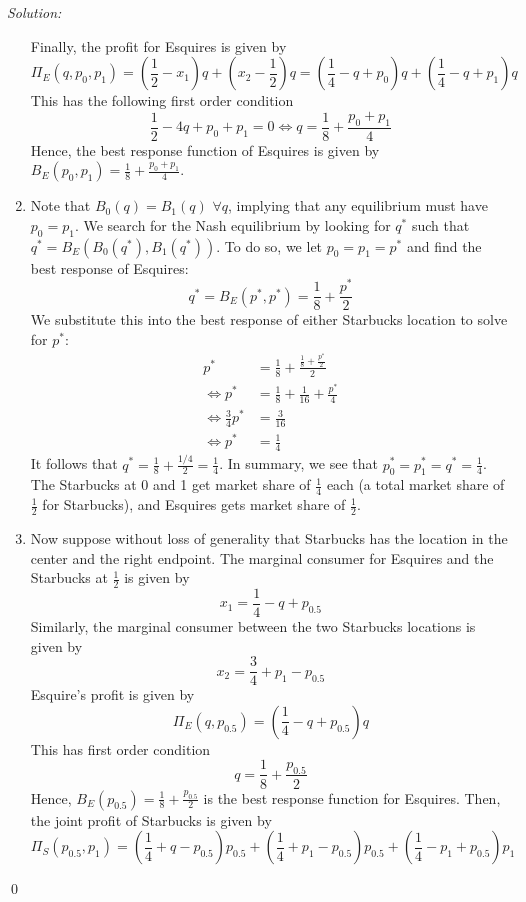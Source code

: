 \documentclass[12pt]{article}
\newenvironment{sol}
    {\emph{Solution:}
    }
    {
    \qed
    }
\begin{document}
\begin{sol}
\begin{enumerate}[label=\alph*) ]
         Finally, the profit for Esquires is given by
         \[\Pi_E(q, p_0, p_1) = \left(\frac{1}{2} - x_1 \right)q + \left(x_2- \frac{1}{2} \right)q = \left( \frac{1}{4} - q + p_0\right) q + \left( \frac{1}{4} - q + p_1\right)q\]
         This has the following first order condition
         \[\frac{1}{2} - 4q + p_0 + p_1 = 0 \iff q = \frac{1}{8} + \frac{p_0 + p_1}{4}\]
         Hence, the best response function of Esquires is given by $B_E(p_0, p_1) = \frac{1}{8} + \frac{p_0 + p_1}{4}$.
         \item Note that $B_0(q) = B_1(q)$ $\forall q$, implying that any equilibrium must have $p_0 = p_1$. We search for the Nash equilibrium by looking for $q^*$ such that $q^* = B_E(B_0(q^*), B_1(q^*))$. To do so, we let $p_0 = p_1 = p^*$ and find the best response of Esquires:
         \[q^* = B_E(p^*,p^*) = \frac{1}{8} + \frac{p^*}{2}\]
         We substitute this into the best response of either Starbucks location to solve for $p^*$:
         \begin{align*}p^* &= \frac{1}{8} + \frac{\frac{1}{8} + \frac{p^*}{2}}{2} \\
            \iff p^* &= \frac{1}{8} + \frac{1}{16} + \frac{p^*}{4}\\
            \iff \frac{3}{4} p^* &= \frac{3}{16}\\
            \iff p^* &= \frac{1}{4}
        \end{align*}
        It follows that $q^* = \frac{1}{8} + \frac{1/4}{2} = \frac{1}{4}$. In summary, we see that $p_0^* = p_1^* = q^* = \frac{1}{4}$. The Starbucks at 0 and 1 get market share of $\frac{1}{4}$ each (a total market share of $\frac{1}{2}$ for Starbucks), and Esquires gets market share of $\frac{1}{2}$.
        \item 
         Now suppose without loss of generality that Starbucks has the location in the center and the right endpoint. The marginal consumer for Esquires and the Starbucks at $\frac{1}{2}$ is given by
        \[x_1 = \frac{1}{4} - q + p_{0.5}\]
        Similarly, the marginal consumer between the two Starbucks locations is given by
        \[x_2 = \frac{3}{4} + p_1 - p_{0.5} \]
        Esquire's profit is given by
        \[\Pi_E(q, p_{0.5}) = \left( \frac{1}{4} - q + p_{0.5}\right) q\]
        This has first order condition
        \[q = \frac{1}{8} + \frac{p_{0.5}}{2}\]
        Hence, $B_E(p_{0.5}) = \frac{1}{8} + \frac{p_{0.5}}{2}$ is the best response function for Esquires.
        Then, the joint profit of Starbucks is given by
        \[\Pi_S(p_{0.5}, p_1) = \left( \frac{1}{4} + q - p_{0.5}\right) p_{0.5} + \left( \frac{1}{4} + p_{1} - p_{0.5}\right) p_{0.5} + \left( \frac{1}{4} - p_1 + p_{0.5}\right) p_{1}\]

\end{enumerate}
\end{sol}
\end{document}
